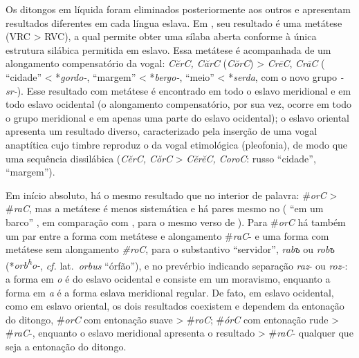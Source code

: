 Os ditongos em líquida foram eliminados posteriormente aos outros e
apresentam resultados diferentes em cada língua eslava. Em , seu
resultado é uma metátese (VRC > RVC), a qual permite obter
uma sílaba aberta conforme à única estrutura silábica permitida em
eslavo. Essa metátese é acompanhada de um alongamento compensatório da
vogal: \emph{CĕrC, CărC} (\emph{CŏrC}) > \emph{CrēC},
\emph{CrāC} ( ``cidade'' < *\emph{gordo-},
 ``margem'' < *\emph{bergo-}, 
``meio'' < *\emph{serda}, com o novo grupo \emph{-sr-}). Esse resultado com
metátese é encontrado em todo o eslavo
meridional e em todo eslavo ocidental (o alongamento compensatório, por
sua vez, ocorre em todo o grupo meridional e em apenas uma parte do
eslavo ocidental); o eslavo oriental apresenta um resultado diverso,
caracterizado pela inserção de uma vogal anaptítica cujo timbre reproduz
o da vogal etimológica (pleofonia), de modo que uma sequência
dissilábica (\emph{CĕrC, CŏrC} > \emph{CĕrĕC, CoroC}:
russo  ``cidade'',  ``margem'').

Em início absoluto, há o mesmo resultado que no interior de palavra:
\#\emph{orC} >  \#\emph{raC}, mas a metátese é menos
sistemática e há pares mesmo no  ( ``em um
barco'' , em comparação com 
, para o mesmo verso de ). Para \#\emph{orC} há
também um par entre a forma com metátese e alongamento \#\emph{raC}- e
uma forma com metátese sem alongamento \emph{\#roC}, para o substantivo
``servidor'', \emph{rabъ} ou \emph{robъ}
(*\emph{orb\textsuperscript{h}o-}, \emph{cf.} lat.~\emph{orbus} ``órfão''), e
no prevérbio indicando separação \emph{raz}- ou \emph{roz-}: a forma em
\emph{o} é do eslavo ocidental e consiste em um moravismo, enquanto a
forma em \emph{a} é a forma eslava meridional regular. De fato, em
eslavo ocidental, como em eslavo oriental, os dois resultados coexistem
e dependem da entonação do ditongo, \#\emph{orC} com entonação suave
> \#\emph{roC}; \#\emph{órC} com entonação rude
> \#\emph{raC}-, enquanto o eslavo meridional apresenta o
resultado > \#\emph{raC}- qualquer que seja a entonação do
ditongo.

